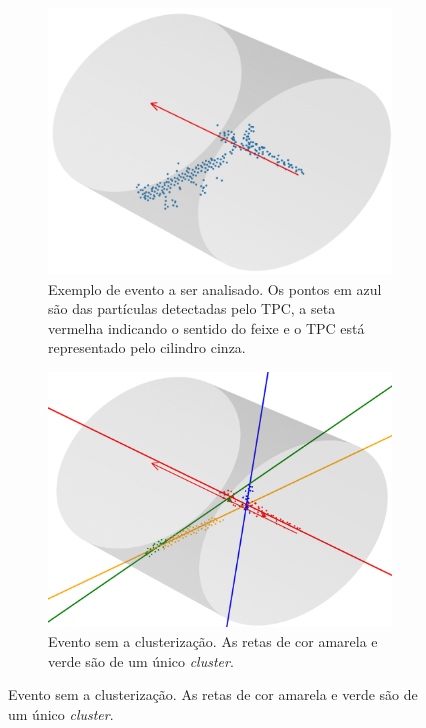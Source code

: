 \documentclass[a4paper,12pt,oneside]{book}
\begin{document}
\begin{figure}[H]
\centering
    \begin{subfigure}[b]{\textwidth}
        \centering
        \includegraphics[scale = 0.4]{figs/Figure_1.png}
        \caption{Exemplo de evento a ser analisado. Os pontos em azul são das partículas detectadas pelo TPC, a seta vermelha indicando o sentido do feixe e o TPC está representado pelo cilindro cinza.}
        \label{subfig:exemplo_1}
    \end{subfigure}%
    \hfill
    \begin{subfigure}[t]{0.45\textwidth}
        \centering
        \includegraphics[scale=0.25, width=.95\columnwidth]{figs/Figure_8.png}
        \caption{Evento sem a clusterização. As retas de cor amarela e verde são de um único \textit{cluster}.}

\end{subfigure}
\end{figure}
\end{document}
